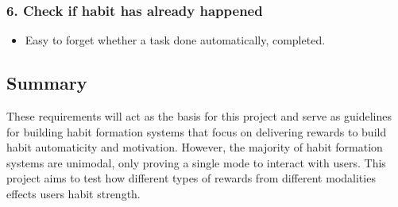 \subsubsection*{6. Check if habit has already happened}
  \begin{itemize}
    \item Easy to forget whether a task done automatically, completed.
  \end{itemize}


\subsection*{Summary}

These requirements will act as the basis for this project and serve as guidelines for building habit formation systems that focus on delivering rewards to build habit automaticity and motivation. However, the majority of habit formation systems are unimodal, only proving a single mode to interact with users. This project aims to test how different types of rewards from different modalities effects users habit strength.
